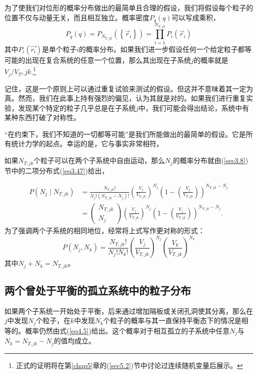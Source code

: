 \documentclass[UTF8]{ctexart}
\numberwithin{equation}{section}%
\numberwithin{figure}{section}%
\begin{document}
    为了使我们对位形的概率分布做出的最简单且合理的假设，我们将假设每个粒子的位置不仅与动量无关，而且相互独立。概率密度$P_q(q)$可以写成乘积，
    \begin{equation}
        P_{q}(q)=P_{N_{T, j k}}\left(\left\{\vec{r}_{i}\right\}\right)=\prod_{i=1}^{N_{T, j k}} P_{i}\left(\vec{r}_{i}\right)
    \end{equation}
    其中$P_i(\vec{r_i})$是单个粒子$i$的概率分布。如果我们进一步假设任何一个给定粒子都等可能的出现在复合系统的任意一个位置，那么其出现在子系统$j$的概率就是$V_j/V_T,jk$.\footnote{正式的证明将在第\ref{chap5}章的(\ref{sec5.2})节中讨论过连续随机变量后展示。}

    记住，这是一个原则上可以通过重复试验来测试的假设。但这并不意味着其一定为真。然而，我们在此事上持有强烈的偏见，认为其就是对的。如果我们进行重复实验，发现某个特定的粒子几乎总是在子系统$j$中，我们可能会得出结论，系统中有某种东西打破了对称性。

    “在约束下，我们不知道的一切都等可能”是我们所能做出的最简单的假设。它是所有统计力学的起点。幸运的是，它与事实非常相符。

    如果$N_{T,jk}$个粒子可以在两个子系统中自由运动，那么$N_j$的概率分布就由(\ref{sec3.8})节中的二项分布式(\ref{eq3.47})给出，

    \begin{equation}\label{eq4.4}
        \begin{aligned}
            P\left(N_{j} \mid N_{T, j k}\right) &=\frac{N_{T, j k} !}{N_{j} !\left(N_{T, j k}-N_{j}\right) !}\left(\frac{V_{j}}{V_{T, j k}}\right)^{N_{j}}\left(1-\left(\frac{V_{j}}{V_{T, j k}}\right)\right)^{N_{T, j k}-N_{j}} \\
            &=\left(\begin{array}{c}
            N_{T, j k} \\
            N_{j}
            \end{array}\right)\left(\frac{V_{j}}{V_{T, j k}}\right)^{N_{j}}\left(1-\left(\frac{V_{j}}{V_{T, j k}}\right)\right)^{N_{T, j k}-N_{j}} .
            \end{aligned}
    \end{equation}
    为了强调两个子系统的相同地位，经常将上式写作更对称的形式：
    \begin{equation}\label{eq4.5}
        P\left(N_{j}, N_{k}\right)=\frac{N_{T, j k} !}{N_{j} ! N_{k} !}\left(\frac{V_{j}}{V_{T, j k}}\right)^{N_{j}}\left(\frac{V_{k}}{V_{T, j k}}\right)^{N_{k}}
    \end{equation}
    其中$N_j+N_k=N_{T,jk}$。
    \subsection{两个曾处于平衡的孤立系统中的粒子分布}\label{sec4.3}
    如果两个子系统一开始处于平衡，后来通过增加隔板或关闭孔洞使其分离，那么在$j$中发现$N_j$个粒子，在$k$中发现$N_k$个粒子的概率与其一直保持平衡态下的情况是相等的。概率仍然由式(\ref{eq4.5})给出。这个概率对于相互孤立的子系统中任意$N_j$与$N_k=N_{T,jk}-N_j$的值均成立。
    
\end{document}
